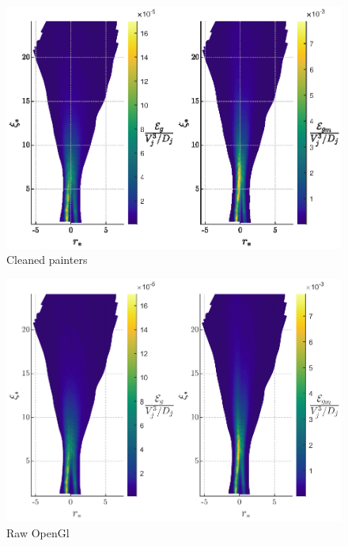 \documentclass{article}
\begin{document}
\begin{figure}
    \centering
    \includegraphics{figs/PG_4Hz_DissConts_CLEAN.eps}
    \caption{Cleaned painters}
    \label{conts2}
\end{figure}

\begin{figure}
    \centering
    \includegraphics{figs/PG_4Hz_diss_contours2.eps}
    \caption{Raw OpenGl}
    \label{conts3}
\end{figure}
\end{document}
